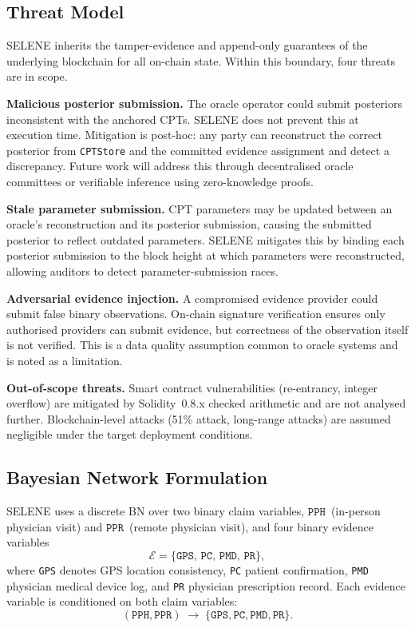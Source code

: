 \documentclass[journal]{IEEEtran}
\begin{document}
\subsection{Threat Model}

SELENE inherits the tamper-evidence and append-only
guarantees of the underlying blockchain for all
on-chain state. Within this boundary, four threats
are in scope.

\textbf{Malicious posterior submission.}
The oracle operator could submit posteriors inconsistent
with the anchored CPTs. SELENE does not prevent this at
execution time. Mitigation is post-hoc: any party can
reconstruct the correct posterior from \texttt{CPTStore}
and the committed evidence assignment and detect a
discrepancy. Future work will address this through
decentralised oracle committees or verifiable inference
using zero-knowledge proofs.

\textbf{Stale parameter submission.}
CPT parameters may be updated between an oracle's
reconstruction and its posterior submission, causing
the submitted posterior to reflect outdated parameters.
SELENE mitigates this by binding each posterior submission
to the block height at which parameters were
reconstructed, allowing auditors to detect
parameter-submission races.

\textbf{Adversarial evidence injection.}
A compromised evidence provider could submit false
binary observations. On-chain signature verification
ensures only authorised providers can submit evidence,
but correctness of the observation itself is not
verified. This is a data quality assumption common to
oracle systems and is noted as a limitation.

\textbf{Out-of-scope threats.}
Smart contract vulnerabilities (re-entrancy, integer
overflow) are mitigated by Solidity~0.8.x checked
arithmetic and are not analysed further.
Blockchain-level attacks (51\% attack, long-range
attacks) are assumed negligible under the target
deployment conditions.

\subsection{Bayesian Network Formulation}

SELENE uses a discrete BN over two binary claim
variables, $\texttt{PPH}$~(in-person physician visit)
and $\texttt{PPR}$~(remote physician visit), and four
binary evidence variables
\[
  \mathcal{E}=\{
    \texttt{GPS},\,\texttt{PC},\,
    \texttt{PMD},\,\texttt{PR}
  \},
\]
where \texttt{GPS} denotes GPS location consistency,
\texttt{PC} patient confirmation, \texttt{PMD}
physician medical device log, and \texttt{PR}
physician prescription record.
Each evidence variable is conditioned on both claim
variables:
\[
  (\texttt{PPH},\texttt{PPR})
  \;\rightarrow\;
  \{\texttt{GPS},\texttt{PC},\texttt{PMD},\texttt{PR}\}.
\]
\end{document}
